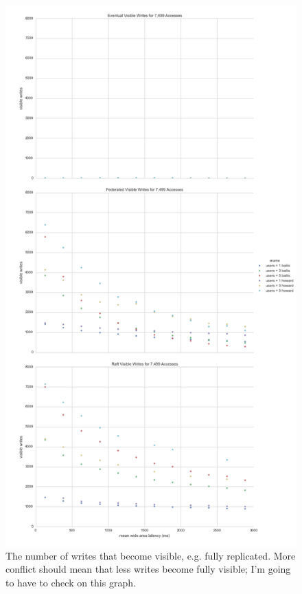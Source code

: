\documentclass[10pt,letterpaper]{article}
\begin{document}
\begin{figure}[!h]
    \centering
        \includegraphics[height=0.9\textheight]{figures/visible_writes.png}
        \caption{\textsf{The number of writes that become visible, e.g. fully replicated. More conflict should mean that less writes become fully visible; I'm going to have to check on this graph.}}
        \label{fig:visible_writes}
\end{figure}
\end{document}
